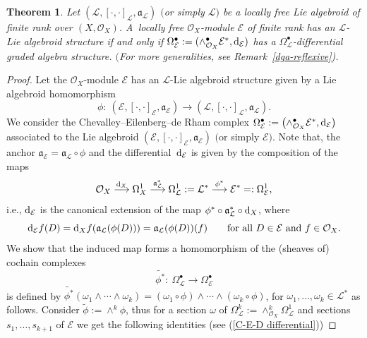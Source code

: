\documentclass[pdftex]{sigma}
\numberwithin{equation}{section}
\newtheorem{Thm}{Theorem}[section]
\theoremstyle{definition}
\begin{document}
\begin{Thm} \label{L-Lie alg & dga}
	Let $(\mathcal{L}, [\cdot, \cdot]_{\mathcal{L}}, \mathfrak{a}_{\mathcal{L}})$ $($or simply $\mathcal{L})$ be a locally free Lie algebroid of finite rank over $(X,\mathcal{O}_X)$.
	A~locally free $\mathcal{O}_X$-module $\mathcal{E}$ of finite rank has an $\mathcal{L}$-Lie algebroid structure if and only if $\Omega^{\bullet}_{\mathcal{E}}:=(\wedge^{\bullet}_{\mathcal{O}_X}\mathcal{E}^*,{\rm d}_{\mathcal{E}})$ has a $\Omega^{\bullet}_{\mathcal{L}}$-differential graded algebra structure. $($For more generalities, see Remark~{\rm \ref{dga-reflexive})}.
\end{Thm}
\begin{proof}
	Let the $\mathcal{O}_X$-module $\mathcal{E}$ has an $\mathcal{L}$-Lie algebroid structure given by a Lie algebroid homomorphism
\[
\phi\colon \ (\mathcal{E}, [\cdot, \cdot]_{\mathcal{E}}, \mathfrak{a}_{\mathcal{E}}) \rightarrow (\mathcal{L}, [\cdot, \cdot]_{\mathcal{L}}, \mathfrak{a}_{\mathcal{L}}).
\]
	We consider the Chevalley--Eilenberg--de Rham complex $\Omega^{\bullet}_{\mathcal{E}}:=\bigl(\wedge^{\bullet}_{\mathcal{O}_X}\mathcal{E}^*,{\rm d}_{\mathcal{E}}\bigr)$ associated to the Lie algebroid $(\mathcal{E}, [\cdot, \cdot]_{\mathcal{E}}, \mathfrak{a}_{\mathcal{E}})$ $($or simply $\mathcal{E})$. Note that, the anchor $\mathfrak{a}_{\mathcal{E}}=\mathfrak{a}_{\mathcal{L}} \circ \phi$ and the differential~${\rm d}_{\mathcal{E}}$ is given by the composition of the maps
\[
\mathcal{O}_X \overset{{\rm d}_X}{\longrightarrow}\Omega^1_X \overset{\mathfrak{a}_{\mathcal{L}}^*}{\longrightarrow} \Omega^1_{\mathcal{L}}:= \mathcal{L}^* \overset{\phi^*}{\longrightarrow} \mathcal{E}^*=:\Omega^1_{\mathcal{E}},
\]
 i.e., ${\rm d}_{\mathcal{E}}$ is the canonical extension of the map $\phi^* \circ \mathfrak{a}_{\mathcal{L}}^* \circ {\rm d}_X$, where
\[
{\rm d}_{\mathcal{E}}f (D)={\rm d}_Xf(\mathfrak{a}_{\mathcal{L}}(\phi(D)))= \mathfrak{a}_{\mathcal{L}}(\phi(D))(f)\qquad \text{for all $D \in \mathcal{E}$ and $f \in \mathcal{O}_X$}.
\]
We show that the induced map forms a homomorphism of the (sheaves of) cochain complexes
\[
\widetilde{\phi^*}\colon \ \Omega^{\bullet}_{\mathcal{L}} \rightarrow \Omega^{\bullet}_{\mathcal{E}}
\] is defined by
	$\widetilde{\phi^*}(\omega_1 \wedge \cdots \wedge \omega_k)= (\omega_1 \circ \phi )\wedge \cdots \wedge (\omega_k \circ \phi )$,
	for $\omega_1, \dots, \omega_k \in \mathcal{L}^*$ as follows. Consider $\tilde{\phi}:=\wedge^k \phi$, thus
	for a section $\omega$ of $ \Omega^{k}_{\mathcal{L}}:= \wedge^k_{\mathcal{O}_X} \Omega^{1}_{\mathcal{L}}$ and sections $s_1, \dots, s_{k+1}$ of $\mathcal{E}$ we get the following identities	(see (\ref{C-E-D differential}))	

\end{proof}
\end{document}
